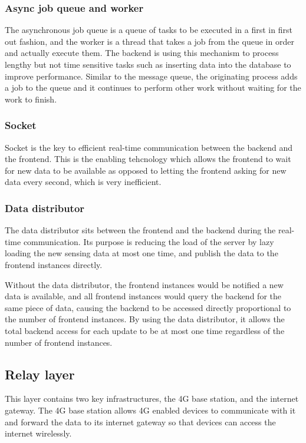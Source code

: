 \documentclass[../thesis.tex]{subfiles}
\begin{document}
\subsubsection{Async job queue and worker}

The asynchronous job queue is a queue of tasks to be executed in a first in first out fashion, and the worker is a thread that takes a job from the queue in order and actually execute them. The backend is using this mechanism to process lengthy but not time sensitive tasks such as inserting data into the database to improve performance. Similar to the message queue, the originating process adds a job to the queue and it continues to perform other work without waiting for the work to finish. 

\subsubsection{Socket}

Socket is the key to efficient real-time communication between the backend and the frontend. This is the enabling tehcnology which allows the frontend to wait for new data to be available as opposed to letting the frontend asking for new data every second, which is very inefficient. 

\subsubsection{Data distributor}

The data distributor sits between the frontend and the backend during the real-time communication. Its purpose is reducing the load of the server by lazy loading the new sensing data at most one time, and publish the data to the frontend instances directly. 

Without the data distributor, the frontend instances would be notified a new data is available, and all frontend instances would query the backend for the same piece of data, causing the backend to be accessed directly proportional to the number of frontend instances. By using the data distributor, it allows the total backend access for each update to be at most one time regardless of the number of frontend instances. 

\subsection{Relay layer}

This layer contains two key infrastructures, the 4G base station, and the internet gateway. The 4G base station allows 4G enabled devices to communicate with it and forward the data to its internet gateway so that devices can access the internet wirelessly. 
\end{document}
